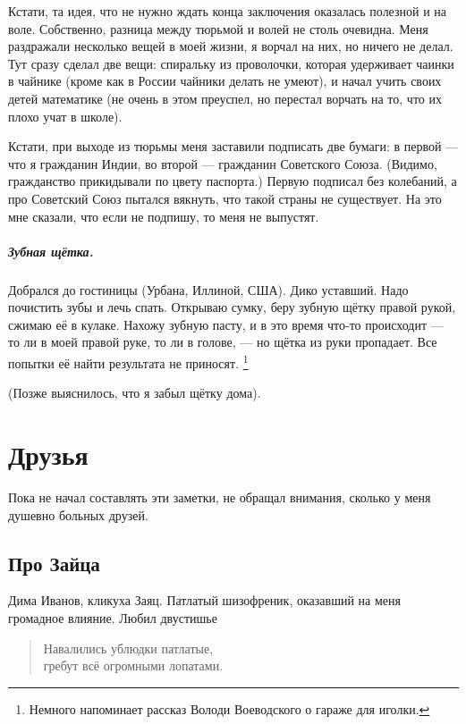 \documentclass{book}
\begin{document}
Кстати, та идея, что не нужно ждать конца заключения оказалась полезной и на воле.
Собственно, разница между тюрьмой и волей не столь очевидна.
Меня раздражали несколько вещей в моей жизни, я ворчал на них, но ничего не делал.
Тут сразу сделал две вещи: спиральку из проволочки, которая удерживает чаинки в чайнике (кроме как в России чайники делать не умеют), и начал учить своих детей математике (не очень в этом преуспел, но перестал ворчать на то, что их плохо учат в школе).

Кстати, при выходе из тюрьмы меня заставили подписать две бумаги: в первой --- что я гражданин Индии, во второй --- гражданин Советского Союза.
(Видимо, гражданство прикидывали по цвету паспорта.)
Первую подписал без колебаний, а про Советский Союз пытался вякнуть, что такой страны не существует.
На это мне сказали, что если не подпишу, то меня не выпустят. 

\paragraph{Зубная щётка.}
Добрался до гостиницы (Урбана, Иллиной, США).
Дико уставший.
Надо почистить зубы и лечь спать.
Открываю сумку, беру зубную щётку правой рукой, сжимаю её в кулаке.
Нахожу зубную пасту, и в это время что-то происходит --- то ли в моей правой руке, то ли в голове, --- но щётка из руки пропадает.
Все попытки её найти результата не приносят.%
\footnote{Немного напоминает рассказ Володи Воеводского о гараже для иголки.}

(Позже выяснилось, что я забыл щётку дома).



\chapter*{Друзья}

Пока не начал составлять эти заметки, не обращал внимания, сколько у меня душевно больных друзей.

\section*{Про Зайца}

Дима Иванов, кликуха Заяц.
Патлатый шизофреник, оказавший на меня громадное влияние.
Любил двустишье
\begin{verse}
Навалились ублюдки патлатые,\\
\quad
гребут всё огромными лопатами.
\end{verse}
\end{document}

